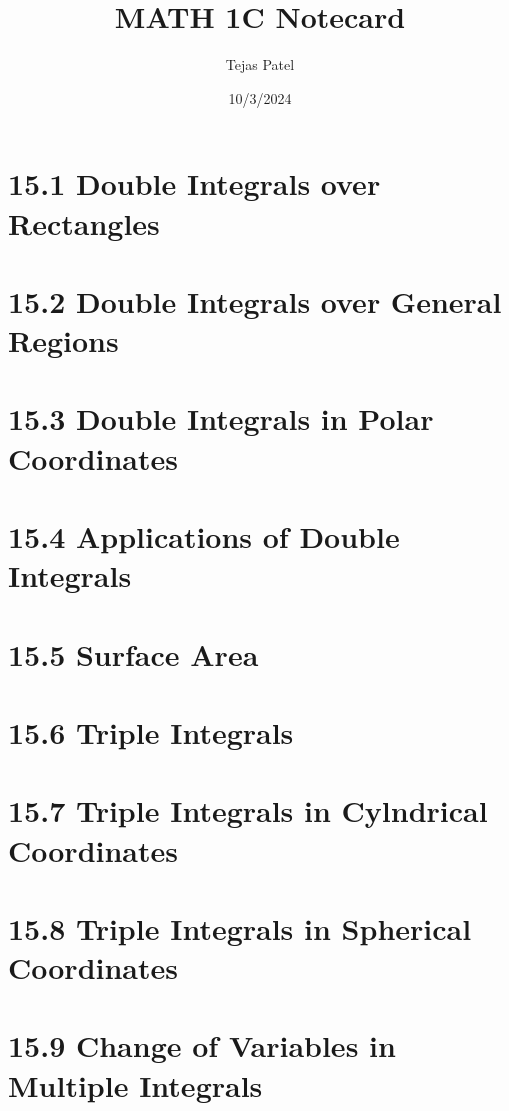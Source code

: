 \documentclass{article}
\title{MATH 1C Notecard}
\date{10/3/2024}
\author{Tejas Patel}
\begin{document}
\maketitle
\tableofcontents
\section*{15.1 Double Integrals over Rectangles}
\section*{15.2 Double Integrals over General Regions}
\section*{15.3 Double Integrals in Polar Coordinates}
\section*{15.4 Applications of Double Integrals}
\section*{15.5 Surface Area}
\section*{15.6 Triple Integrals}
\section*{15.7 Triple Integrals in Cylndrical Coordinates}
\section*{15.8 Triple Integrals in Spherical Coordinates}
\section*{15.9 Change of Variables in Multiple Integrals}
\end{document}
